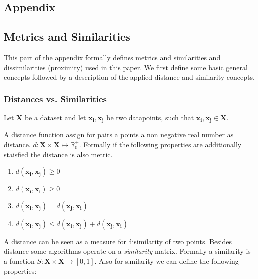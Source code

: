 \documentclass[12pt,a4paper,bibliography=totocnumbered,listof=totocnumbered]{scrartcl}
\begin{document}
\begin{appendix}
	
\section*{Appendix}
{}

\subsection*{Metrics and Similarities}

This part of the appendix formally defines metrics and similarities and dissimilarities (proximity) used in this paper. We first define some basic general concepts followed by a description of the applied distance and similarity concepts. 

\subsubsection*{Distances vs. Similarities}

Let $\boldsymbol{X}$ be a dataset and let $\boldsymbol{x_i},\boldsymbol{x_j}$ be two datapoints, such that $\boldsymbol{x_i},\boldsymbol{x_j} \in \boldsymbol{X}$. 

A distance function assign for pairs a points a non negative real number as distance. $d:\boldsymbol{X}\times \boldsymbol{X} \mapsto \mathbb{R}_0^+$. Formally if the following properties are additionally staisfied the distance is also metric.

\begin{enumerate}
	\setlength{\itemsep}{-5pt}
	\item $d(\boldsymbol{x_i},\boldsymbol{x_j}) \ge 0$
	\item $d(\boldsymbol{x_i},\boldsymbol{x_i}) \ge 0$
	\item $d(\boldsymbol{x_i},\boldsymbol{x_j}) = d(\boldsymbol{x_j},\boldsymbol{x_i}) $
	\item $d(\boldsymbol{x_i},\boldsymbol{x_j}) \le d(\boldsymbol{x_i},\boldsymbol{x_j})+ d(\boldsymbol{x_j},\boldsymbol{x_i}) $
\end{enumerate}

A distance can be seen as a measure for disimilarity of two points. Besides distance some algorithms operate on a \textit{similarity} matrix. Formally a similarity is a function  $ S : \boldsymbol{X} \times \boldsymbol{X} \mapsto [0,1] $. Also for similarity we can define the following properties:


\end{appendix}
\end{document}
